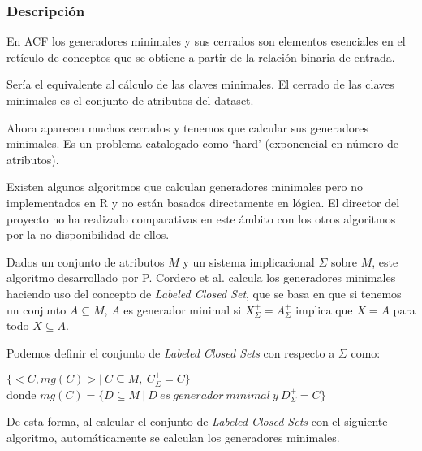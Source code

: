 \subsubsection{Descripci\'on} 

En ACF los generadores minimales y sus cerrados son elementos esenciales en el ret\'iculo de conceptos  que se obtiene a partir de la relaci\'on binaria de entrada. 

Ser\'ia el equivalente al c\'alculo de las claves minimales. El cerrado de las claves minimales es el conjunto de atributos del dataset. 

Ahora aparecen muchos cerrados y tenemos que calcular sus generadores minimales. Es un problema catalogado como \enquote*{hard} (exponencial en n\'umero de atributos).

Existen algunos algoritmos que  calculan generadores minimales pero no implementados en R y no est\'an basados directamente en l\'ogica. El director del proyecto no ha realizado comparativas en este \'ambito con los otros algoritmos por la no disponibilidad de ellos.



Dados un conjunto de atributos \(M\) y un sistema implicacional \(\Sigma\) sobre \(M\), este algoritmo desarrollado por P. Cordero et al. \cite{LCS} calcula los generadores minimales haciendo uso del concepto de \textit{Labeled Closed Set}, que se basa en que si tenemos un conjunto \(A \subseteq M\), \(A\) es generador minimal si \(X^+_{\Sigma} = A^+_{\Sigma}\) implica que \(X = A\) para todo  \(X \subseteq A\). 

Podemos definir el conjunto de \textit{Labeled Closed Sets} con respecto a \(\Sigma\) como:
\begin{center}
    \(\{<C,mg(C)> | \ C \subseteq M, \ C^+_{\Sigma} = C \}\)\\
    donde \(mg(C) = \{D \subseteq M \ | \ D \ es \ generador \ minimal \ y \ D^+_{\Sigma} = C \}\)
\end{center}

De esta forma, al calcular el conjunto de \textit{Labeled Closed Sets} con el siguiente algoritmo, autom\'aticamente se calculan los generadores minimales.\\

